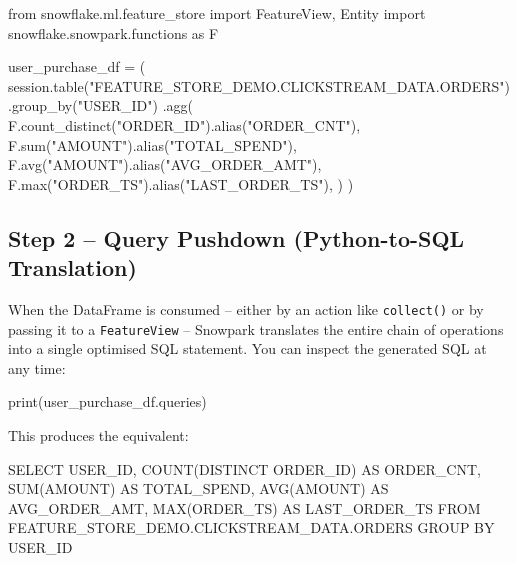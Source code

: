 \documentclass[
  letterpaper,
  DIV=11,
  numbers=noendperiod]{scrreprt}
\newenvironment{Shaded}{\begin{snugshade}}{\end{snugshade}}
\newcommand{\BuiltInTok}[1]{\textcolor[rgb]{0.00,0.23,0.31}{#1}}
\newcommand{\FunctionTok}[1]{\textcolor[rgb]{0.28,0.35,0.67}{#1}}
\newcommand{\ImportTok}[1]{\textcolor[rgb]{0.00,0.46,0.62}{#1}}
\newcommand{\KeywordTok}[1]{\textcolor[rgb]{0.00,0.23,0.31}{#1}}
\newcommand{\NormalTok}[1]{\textcolor[rgb]{0.00,0.23,0.31}{#1}}
\newcommand{\OperatorTok}[1]{\textcolor[rgb]{0.37,0.37,0.37}{#1}}
\newcommand{\StringTok}[1]{\textcolor[rgb]{0.13,0.47,0.30}{#1}}
\begin{document}
\begin{Shaded}
\begin{Highlighting}[]
\ImportTok{from}\NormalTok{ snowflake.ml.feature\_store }\ImportTok{import}\NormalTok{ FeatureView, Entity}
\ImportTok{import}\NormalTok{ snowflake.snowpark.functions }\ImportTok{as}\NormalTok{ F}

\NormalTok{user\_purchase\_df }\OperatorTok{=}\NormalTok{ (}
\NormalTok{    session.table(}\StringTok{"FEATURE\_STORE\_DEMO.CLICKSTREAM\_DATA.ORDERS"}\NormalTok{)}
\NormalTok{    .group\_by(}\StringTok{"USER\_ID"}\NormalTok{)}
\NormalTok{    .agg(}
\NormalTok{        F.count\_distinct(}\StringTok{"ORDER\_ID"}\NormalTok{).alias(}\StringTok{"ORDER\_CNT"}\NormalTok{),}
\NormalTok{        F.}\BuiltInTok{sum}\NormalTok{(}\StringTok{"AMOUNT"}\NormalTok{).alias(}\StringTok{"TOTAL\_SPEND"}\NormalTok{),}
\NormalTok{        F.avg(}\StringTok{"AMOUNT"}\NormalTok{).alias(}\StringTok{"AVG\_ORDER\_AMT"}\NormalTok{),}
\NormalTok{        F.}\BuiltInTok{max}\NormalTok{(}\StringTok{"ORDER\_TS"}\NormalTok{).alias(}\StringTok{"LAST\_ORDER\_TS"}\NormalTok{),}
\NormalTok{    )}
\NormalTok{)}
\end{Highlighting}
\end{Shaded}

\hypertarget{step-2-query-pushdown-python-to-sql-translation}{%
\subsection{Step 2 -- Query Pushdown (Python-to-SQL
Translation)}\label{step-2-query-pushdown-python-to-sql-translation}}

When the DataFrame is consumed -- either by an action like
\texttt{collect()} or by passing it to a \texttt{FeatureView} --
Snowpark translates the entire chain of operations into a single
optimised SQL statement. You can inspect the generated SQL at any time:

\begin{Shaded}
\begin{Highlighting}[]
\BuiltInTok{print}\NormalTok{(user\_purchase\_df.queries)}
\end{Highlighting}
\end{Shaded}

This produces the equivalent:

\begin{Shaded}
\begin{Highlighting}[]
\KeywordTok{SELECT}\NormalTok{ USER\_ID,}
       \FunctionTok{COUNT}\NormalTok{(}\KeywordTok{DISTINCT}\NormalTok{ ORDER\_ID) }\KeywordTok{AS}\NormalTok{ ORDER\_CNT,}
       \FunctionTok{SUM}\NormalTok{(AMOUNT)              }\KeywordTok{AS}\NormalTok{ TOTAL\_SPEND,}
       \FunctionTok{AVG}\NormalTok{(AMOUNT)              }\KeywordTok{AS}\NormalTok{ AVG\_ORDER\_AMT,}
       \FunctionTok{MAX}\NormalTok{(ORDER\_TS)            }\KeywordTok{AS}\NormalTok{ LAST\_ORDER\_TS}
\KeywordTok{FROM}\NormalTok{ FEATURE\_STORE\_DEMO.CLICKSTREAM\_DATA.ORDERS}
\KeywordTok{GROUP} \KeywordTok{BY}\NormalTok{ USER\_ID}
\end{Highlighting}
\end{Shaded}
\end{document}
